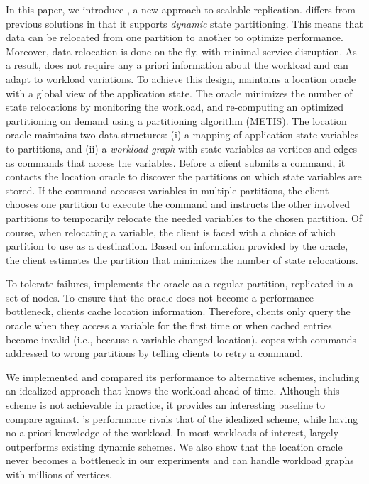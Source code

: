 In this paper, we introduce \dynastar, a new approach to scalable replication.
\dynastar differs from previous solutions in that it supports \emph{dynamic} state partitioning.
This means that data can be relocated from one partition to another to optimize performance.
Moreover, data relocation is done on-the-fly, with minimal service disruption.
As a result, \dynastar does not require any a priori information about the workload and can adapt to workload variations.
To achieve this design, \dynastar maintains a
location oracle with a global view of the application state.  The oracle minimizes the
number of state relocations by monitoring the workload, and
re-computing an optimized partitioning on demand using a 
partitioning algorithm (METIS).  
The location oracle maintains two data structures: (i) a mapping of application state variables to partitions, and (ii) a \emph{workload graph} with state variables as vertices and edges as commands that access the variables.  
Before a client submits a command, it contacts the
location oracle to discover the partitions on which state variables are
stored.  If the command accesses variables in multiple partitions, the
client chooses one partition to execute the command and instructs the other involved partitions to temporarily relocate 
the needed variables to the chosen partition. Of course, when relocating a variable, the client
is faced with a choice of which partition to use as a destination.
Based on information provided by the oracle, the client estimates the partition that minimizes the number of state relocations.

To tolerate failures, \dynastar implements the oracle as a regular partition, replicated in a set of nodes.
To ensure that the oracle does not become a performance bottleneck, clients cache location information.
Therefore, clients only query the oracle when they access a variable for the first time or when cached entries become invalid (i.e., because a variable changed location).
\dynastar copes with commands addressed to wrong partitions by telling clients to retry a command.

We implemented \dynastar and compared its performance to
alternative schemes, including an idealized approach that knows the workload ahead of time.
Although this scheme is not achievable in practice, it provides an interesting baseline to compare against.
\dynastar's performance rivals that of the idealized scheme, while having no a priori knowledge of the workload.
In most workloads of interest, \dynastar largely outperforms existing dynamic schemes.
We also show that the location oracle never becomes a bottleneck in our experiments and can handle workload graphs with millions of vertices.

